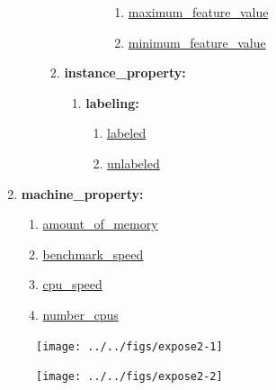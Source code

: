 \documentclass[a4paper,12pt, english]{article}
\begin{document}
\begin{enumerate}
\begin{enumerate}
\begin{enumerate}
\begin{enumerate}
\begin{enumerate}
\begin{enumerate}
				\item \underline{maximum\_feature\_value}
				\item \underline{minimum\_feature\_value}
				\end{enumerate}			
			\end{enumerate}		
		\end{enumerate}
	\item \textbf{instance\_property:}
		\begin{enumerate}
		\item \textbf{labeling:}
			\begin{enumerate}
			\item \underline{labeled}
			\item \underline{unlabeled}
			\end{enumerate}		
		\end{enumerate}	
\end{enumerate}

\end{enumerate}

\item \textbf{machine\_property:}
	\begin{enumerate}
	\item \underline{amount\_of\_memory}
	\item \underline{benchmark\_speed}
	\item \underline{cpu\_speed}
	\item \underline{number\_cpus}
	\end{enumerate}
\end{enumerate}
\newpage

\begin{figure}[h]   
  \centering 
  \texttt{[image: ../../figs/expose2-1]}
  \caption{}
  \label{fig:expose2-1}
\end{figure}

\begin{figure}[h]   
  \centering 
  \texttt{[image: ../../figs/expose2-2]}
  \caption{}
  \label{fig:expose2-2}
\end{figure}
\end{document}
